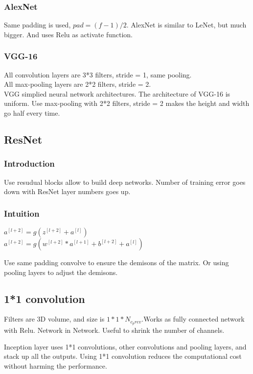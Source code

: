 \documentclass{article}
\begin{document}
	\subsubsection{AlexNet}
	Same padding is used, $pad = (f - 1)/2$. AlexNet is similar to LeNet, but much bigger. And uses Relu as activate function.
	\subsubsection{VGG-16}
	All convolution layers are 3*3 filters, stride = 1, same pooling.\\
	All max-pooling layers are 2*2 filters, stride = 2.\\
	VGG simplied neural network architectures. The architecture of VGG-16 is uniform. Use max-pooling with 2*2 filters, stride = 2 makes the height and width go half every time.
	\subsection{ResNet}
	\subsubsection{Introduction}
	Use resudual blocks allow to build deep networks. Number of training error goes down with ResNet layer numbers goes up.
	\subsubsection{Intuition}
	\begin{center}
		$a^{[l+2]} = g(z^{[l+2]}+a^{[l]})$ \\
		$a^{[l+2]} = g(w^{[l+2]}*a^{[l+1]}+b^{[l+2]}+a^{[l]})$
	\end{center}
	\begin{flushleft}
		Use same padding convolve to ensure the demisons of the matrix. Or using pooling layers to adjust the demisons.
	\end{flushleft}
	\subsection{1*1 convolution}
	\begin{flushleft}
		Filters are 3D volume, and size is $1*1*N_{c_prev}$.Works as fully connected network with Relu. Network in Network. Useful to shrink the number of channels.
	\end{flushleft}
	\begin{flushleft}
		Inception layer uses 1*1 convolutions, other convolutions and pooling layers, and stack up all the outputs. Using 1*1 convolution reduces the computational cost without harming the performance.
	\end{flushleft}
\end{document}
